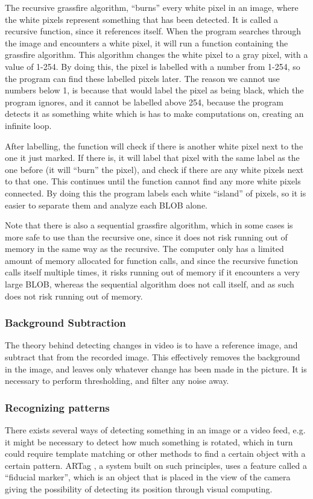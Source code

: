 The recursive grassfire algorithm, “burns” every white pixel in an image, where the white pixels represent something that has been detected. It is called a recursive function, since it references itself. When the program searches through the image and encounters a white pixel, it will run a function containing the grassfire algorithm. This algorithm changes the white pixel to a gray pixel, with a value of 1-254. By doing this, the pixel is labelled with a number from 1-254, so the program can find these labelled pixels later. The reason we cannot use numbers below 1, is because that would label the pixel as being black, which the program ignores, and it cannot be labelled above 254, because the program detects it as something white which is has to make computations on, creating an infinite loop.

After labelling, the function will check if there is another white pixel next to the one it just marked. If there is, it will label that pixel with the same label as the one before (it will “burn” the pixel), and check if there are any white pixels next to that one. This continues until the function cannot find any more white pixels connected.
By doing this the program labels each white “island” of pixels, so it is easier to separate them and analyze each BLOB alone.

Note that there is also a sequential grassfire algorithm, which in some cases is more safe to use than the recursive one, since it does not risk running out of memory in the same way as the recursive. The computer only has a limited amount of memory allocated for function calls, and since the recursive function calls itself multiple times, it risks running out of memory if it encounters a very large BLOB, whereas the sequential algorithm does not call itself, and as such does not risk running out of memory. \parencite{Moeslund2012}

\subsubsection{Background Subtraction} \label{sec:BGSub}
The theory behind detecting changes in video is to have a reference image, and subtract that from the recorded image. This effectively removes the background in the image, and leaves only whatever change has been made in the picture. It is necessary to perform thresholding, and filter any noise away.

\subsubsection{Recognizing patterns} \label{sec:detect}
There exists several ways of detecting something in an image or a video feed, e.g. it might be necessary to detect how much something is rotated, which in turn could require template matching or other methods to find a certain object with a certain pattern. 
ARTag \parencite{Fiala2005}, a system built on such principles, uses a feature called a “fiducial marker”, which is an object that is placed in the view of the camera giving the possibility of detecting its position through visual computing.
\bigskip

